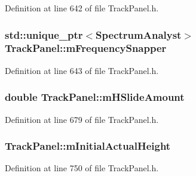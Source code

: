 Definition at line 642 of file Track\+Panel.\+h.

\subsubsection[{\texorpdfstring{m\+Frequency\+Snapper}{mFrequencySnapper}}]{\setlength{\rightskip}{0pt plus 5cm}std\+::unique\+\_\+ptr$<${\bf Spectrum\+Analyst}$>$ Track\+Panel\+::m\+Frequency\+Snapper\hspace{0.3cm}{\ttfamily [protected]}}\hypertarget{class_track_panel_ac8edbb1e21b215c81157c4ba59e6c6d2}{}\label{class_track_panel_ac8edbb1e21b215c81157c4ba59e6c6d2}


Definition at line 643 of file Track\+Panel.\+h.

\subsubsection[{\texorpdfstring{m\+H\+Slide\+Amount}{mHSlideAmount}}]{\setlength{\rightskip}{0pt plus 5cm}double Track\+Panel\+::m\+H\+Slide\+Amount\hspace{0.3cm}{\ttfamily [protected]}}\hypertarget{class_track_panel_a120c208ec3fc115a2ce631120f2398b1}{}\label{class_track_panel_a120c208ec3fc115a2ce631120f2398b1}


Definition at line 679 of file Track\+Panel.\+h.

\subsubsection[{\texorpdfstring{m\+Initial\+Actual\+Height}{mInitialActualHeight}}]{ Track\+Panel\+::m\+Initial\+Actual\+Height\hspace{0.3cm}{\ttfamily [protected]}}\hypertarget{class_track_panel_a869fb10d3f2ab3181553b3047f664ac6}{}\label{class_track_panel_a869fb10d3f2ab3181553b3047f664ac6}


Definition at line 750 of file Track\+Panel.\+h.

